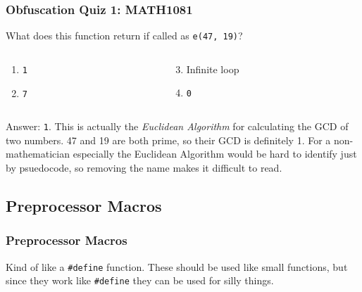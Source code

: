 \documentclass[xcolor]{beamer}
\begin{document}
\begin{frame}
	\frametitle{Obfuscation Quiz 1: MATH1081}
	\pause
	
	What does this function return if called as \texttt{e(47, 19)}?
	
	
	\pause
	
	\begin{columns}
		\begin{column}{0.45\textwidth}
			\begin{enumerate}
				\item \texttt{1}
				\pause
				\item \texttt{7}
			\end{enumerate}
		\end{column}
		\pause
		\begin{column}{0.45\textwidth}
			\begin{enumerate}
				\setcounter{enumi}{2}
				\item Infinite loop
				\pause
				\item \texttt{0}
			\end{enumerate}
		\end{column}
	\end{columns}
	\pause
	
	\vspace{0.5cm}
	
	Answer: \texttt{1}. \pause This is actually the \textit{Euclidean Algorithm} for calculating the GCD of two numbers. 47 and 19 are both prime, so their GCD is definitely 1. \pause For a non-mathematician especially the Euclidean Algorithm would be hard to identify just by psuedocode, so removing the name makes it difficult to read.
\end{frame}

\subsection{Preprocessor Macros}

\begin{frame}
	\frametitle{Preprocessor Macros}
	\pause
	
	Kind of like a \texttt{\#define} function. These should be used like small functions, but since they work like \texttt{\#define} they can be used for silly things.
	\pause
	
	\begin{columns}
		\begin{column}{0.45\textwidth}
			\centering
			
		\end{column}
		\pause
		\begin{column}{0.45\textwidth}
			\centering
			
		\end{column}
	\end{columns}
\end{frame}
\end{document}
